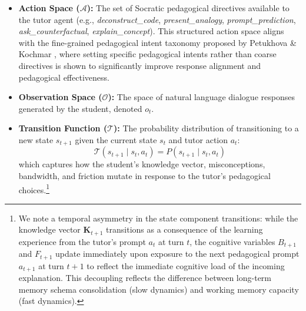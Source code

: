 \begin{itemize}
\begin{itemize}
        \item $B_t \in [0, 1]$ represents the student's available Cognitive Bandwidth (working memory capacity).
        \item $F_t \in [0, 1]$ represents active Cognitive Friction (instructional alignment mismatch).
    \end{itemize}
    Unlike monolithic dialogue architectures that rely on ephemeral history logs, we maintain this high-dimensional state space using a centralised, versioned learner state buffer \cite{intellicode2025}. To resolve concurrency conflicts and prevent state synchronisation race conditions in multi-agent executions, we enforce a strict single-writer policy where only the Epistemic Tracker is authorised to commit write operations to the buffer, while the Socratic Tutor and Simulated Student nodes interface with state snapshots as pure, read-only functions \cite{elhaimeur2026itas}.
    \item \textbf{Action Space ($\mathcal{A}$):} The set of Socratic pedagogical directives available to the tutor agent (e.g., \textit{deconstruct\_code}, \textit{present\_analogy}, \textit{prompt\_prediction}, \textit{ask\_counterfactual}, \textit{explain\_concept}). This structured action space aligns with the fine-grained pedagogical intent taxonomy proposed by Petukhova \& Kochmar \cite{petukhova2025intent}, where setting specific pedagogical intents rather than coarse directives is shown to significantly improve response alignment and pedagogical effectiveness.
    \item \textbf{Observation Space ($\mathcal{O}$):} The space of natural language dialogue responses generated by the student, denoted $o_t$.
    \item \textbf{Transition Function ($\mathcal{T}$):} The probability distribution of transitioning to a new state $s_{t+1}$ given the current state $s_t$ and tutor action $a_t$:
    \begin{equation}
        \mathcal{T}(s_{t+1} \mid s_t, a_t) = P(s_{t+1} \mid s_t, a_t)
    \end{equation}
    which captures how the student's knowledge vector, misconceptions, bandwidth, and friction mutate in response to the tutor's pedagogical choices.\footnote{We note a temporal asymmetry in the state component transitions: while the knowledge vector $\mathbf{K}_{t+1}$ transitions as a consequence of the learning experience from the tutor's prompt $a_t$ at turn $t$, the cognitive variables $B_{t+1}$ and $F_{t+1}$ update immediately upon exposure to the next pedagogical prompt $a_{t+1}$ at turn $t+1$ to reflect the immediate cognitive load of the incoming explanation. This decoupling reflects the difference between long-term memory schema consolidation (slow dynamics) and working memory capacity (fast dynamics).}

\end{itemize}
